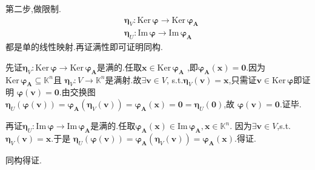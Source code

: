 \begin{formal}
\begin{Proof}
第二步,做限制.
\begin{align*}
    &\bm{\eta}_V:\mathrm{Ker}\,\bm{\varphi}\longrightarrow \mathrm{Ker}\,\bm{\varphi}_{\bm{A}}\\
    &\bm{\eta}_U:\mathrm{Im}\,\bm{\varphi}\longrightarrow \mathrm{Im}\,\bm{\varphi}_{\bm{A}}
\end{align*}
都是单的线性映射.再证满性即可证明同构.

先证$\bm{\eta}_V:\mathrm{Ker}\,\bm{\varphi}\longrightarrow \mathrm{Ker}\,
\bm{\varphi}_{\bm{A}}$是满的.任取$\bm{x}\in \mathrm{Ker}\,\bm{\varphi}_{\bm{A}}$
,即$\bm{\varphi}_{\bm{A}}\left(\bm{x}\right)=\bm{0}$.因为
$\mathrm{Ker}\,\bm{\varphi}_{\bm{A}}\subseteq \mathbb{K}^n$且
$\bm{\eta}_V:V\longrightarrow \mathbb{K}^n$是满射.故$\exists \bm{v}\in V$,
s.t.$\bm{\eta}_V\left(\bm{v}\right)=\bm{x}$,只需证$\bm{v}\in \mathrm{Ker}\,\bm{\varphi}$即证明
$\bm{\varphi}\left(\bm{v}\right)=\bm{0}.$由交换图$\bm{\eta}_U\left(\bm{\varphi}\left(\bm{v}\right)\right)=
\bm{\varphi}_{\bm{A}}\left(\bm{\eta}_V\left(\bm{v}\right)\right)=\bm{\varphi}_{\bm{A}}\left(\bm{x}\right)=\bm{0}=\bm{\eta}_U\left(\bm{0}\right)$,故
$\bm{\varphi}\left(\bm{v}\right)=\bm{0}$.证毕.

再证$\bm{\eta}_U:\mathrm{Im}\,\bm{\varphi}\longrightarrow \mathrm{Im}\,
\bm{\varphi}_{\bm{A}}$是满的.任取$\bm{\varphi}_{\bm{A}}\left(\bm{x}\right)\in \mathrm{Im}\,\bm{\varphi}_{\bm{A}},\bm{x}\in \mathbb{K}^n$.
因为$\exists \bm{v}\in V$,s.t.$\bm{\eta}_V\left(\bm{v}\right)=\bm{x}.$于是
$\bm{\eta}_U\left(\bm{\varphi}\left(\bm{v}\right)\right)=\bm{\varphi}_{\bm{A}}\left(\bm{\eta}_V\left(\bm{v}\right)\right)=\bm{\varphi}_{\bm{A}}\left(\bm{x}\right)$.得证.

同构得证.


\end{Proof}
\end{formal}
